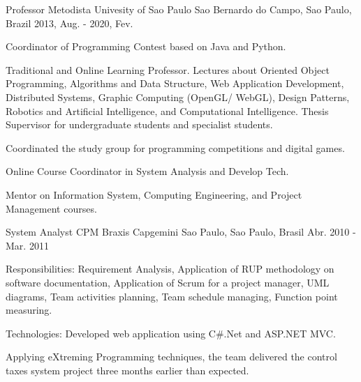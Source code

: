 \begin{cventries}
  \cventry
    {Professor} %
    {Metodista Univesity of Sao Paulo} %
    {Sao Bernardo do Campo, Sao Paulo, Brazil} %
    {2013, Aug. - 2020, Fev.} %
    {
          \begin{cvitems} %
            \item {Coordinator of Programming Contest based on Java and Python.}
            \item {Traditional and Online Learning Professor. Lectures about Oriented Object Programming, Algorithms and Data Structure, Web Application Development, Distributed Systems, Graphic Computing (OpenGL/ WebGL), Design Patterns, Robotics and Artificial Intelligence, and Computational Intelligence. Thesis Supervisor for undergraduate students and specialist students.}
            \item {Coordinated the study group for programming competitions and digital games.}
            \item {Online Course Coordinator in System Analysis and Develop Tech.}
            \item {Mentor on Information System, Computing Engineering, and Project Management courses.}
          \end{cvitems}
    }

  \cventry
    {System Analyst} %
    {CPM Braxis Capgemini} %
    {Sao Paulo, Sao Paulo, Brasil} %
    {Abr. 2010 - Mar. 2011} %
    {
          \begin{cvitems} %
            \item {Responsibilities: Requirement Analysis, Application of RUP methodology on software documentation, Application of Scrum for a project manager, UML diagrams, Team activities planning, Team schedule managing, Function point measuring.}
            \item {Technologies: Developed web application using C\#.Net and ASP.NET MVC.}
            \item {Applying eXtreming Programming techniques, the team delivered the control taxes system project three months earlier than expected.}
          \end{cvitems}
    }


\end{cventries}
